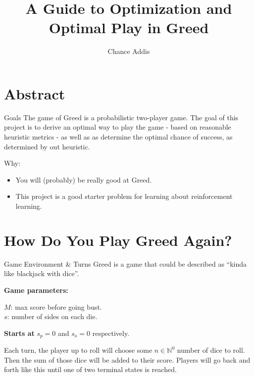 \documentclass{beamer}
\title{A Guide to Optimization and Optimal Play in Greed}
\author{Chance Addis}
\affil{Department of Mathematics and Statistics, Reed College}
\begin{document}
\maketitle

\section{Abstract}

\begin{frame}{Goals}
    The game of Greed is a probabilistic two-player game. The goal of this project is to derive an optimal way to play the game - based on reasonable heuristic metrics - as well as as determine the optimal chance of success, as determined by out heuristic. 
\end{frame}

\begin{frame}
    Why: 

    \begin{itemize}
        \item You will (probably) be really good at Greed.
        \item This project is a good starter problem for learning about reinforcement learning.
    \end{itemize}
\end{frame}

\section{How Do You Play Greed Again?}
\begin{frame}{Game Environment \& Turns}
    Greed is a game that could be described as ``kinda like blackjack with dice''.

    \textbf{Game parameters:}
    
    $M$: max score before going bust. \\
    $s$: number of sides on each die.

    \textbf{Starts at}
    $s_p = 0$ and $s_o = 0$ respectively.

    Each turn, the player up to roll will choose some $n \in \mathbb{N}^0$ number of dice to roll. Then the sum of those dice will be added to their score. Players will go back and forth like this until one of two terminal states is reached.
\end{frame}
\end{document}
